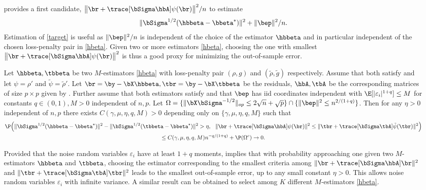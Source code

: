 \documentclass{colt2022} %
\def\eps{\varepsilon}
\numberwithin{equation}{section}
\begin{document}
 provides a first candidate,
$\big\| \br + \trace[\bSigma\hbA]\psi(\br)\big\|^2/n$
to estimate
\begin{equation}
    \|\bSigma^{1/2}(\hbbeta-\bbeta^*)\|^2 + \|\bep\|^2/n.
    \label{target}
\end{equation}
Estimation of \eqref{target} is useful
as $\|\bep\|^2/n$ is independent of the choice of the estimator
$\hbbeta$ and in particular independent of the chosen loss-penalty
pair in \eqref{hbeta}. 
Given two or more estimators \eqref{hbeta},
choosing the one with smallest 
$\big\| \br + \trace[\bSigma\hbA]\psi(\br)\big\|^2$ is thus a
good proxy for minimizing the out-of-sample error.

\begin{corollary}
    \label{corSelection}
    Let $\hbbeta, \tbbeta$ be two $M$-estimators \eqref{hbeta}
    with loss-penalty pair $(\rho,g)$
    and $(\tilde \rho,\tilde g)$ respectively.
    Assume that both satisfy 
    and let $\psi=\rho'$ and $\tilde \psi=\tilde\rho'$.
    Let $\br=\by-\bX\hbbeta, \tbr=\by-\bX\tbbeta$ be the 
    residuals, $\hbA,\tbA$ be the corresponding matrices
    of size $p\times p$ given by .
    Further assume that both estimators satisfy
    and 
    that $\bep$ has iid coordinates
    independent with
    $\E[|\eps_i|^{1+q}] \le M$
    for constants $q\in(0,1),M>0$ independent of $n,p$.
    Let
    $\Omega = \{
        \|\bX\bSigma^{-1/2}\|_{op}\le 2\sqrt n + \sqrt p
        \} \cap
        \{
            \|\bep\|^2 \le n^{2/(1+q)}
        \}$.
    Then for any $\eta>0$ independent of $n,p$
    there exists $C(\gamma,\mu,\eta,q,M)>0$
    depending only on  $\{\gamma,\mu,\eta,q,M\}$ such that
    \begin{multline*}
    \P\Bigl(
    \|\bSigma^{1/2}(\hbbeta-\bbeta^*)\|^2
    -
    \|\bSigma^{1/2}(\tbbeta-\bbeta^*)\|^2 > \eta,
    ~
    ~
    \|\br + \trace[\bSigma\hbA] \psi( \br )\|^2
    \le
    \|\tbr + \trace[\bSigma\tbA] \tilde\psi( \tbr )\|^2
    \Bigr)
    \\\le
    C(\gamma,\mu,\eta,q,M)n^{-q/(1+q)}
    +
    \P(\Omega^c)
    \to 0.
    \end{multline*}
\end{corollary}

Provided that the noise random variables $\eps_i$
have at least $1+q$ moments,
 implies that with probability approaching one
given two $M$-estimators $\hbbeta$ and $\tbbeta$,
choosing the estimator corresponding to the
smallest criteria among 
$\|\br + \trace[\bSigma\hbA]\br\|^2$
and 
$\|\tbr + \trace[\bSigma\tbA]\tbr\|^2$
leads to the smallest out-of-sample error, up to any small constant $\eta>0$.
This allows noise random variables $\eps_i$ with infinite variance.
A similar result can be obtained to select among $K$ different
$M$-estimators \eqref{hbeta}.
\end{document}

